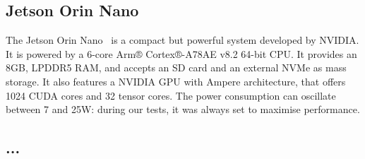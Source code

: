\subsection{Jetson Orin Nano}

The Jetson Orin Nano~\cite{jetson} is a compact but powerful system developed by NVIDIA.
It is powered by a 6-core Arm® Cortex®-A78AE v8.2 64-bit CPU.
It provides an 8GB, LPDDR5 RAM, and accepts an SD card and an external NVMe as mass storage.
It also features a NVIDIA GPU with Ampere architecture, that offers 1024 CUDA cores and 32 tensor cores.
The power consumption can oscillate between 7 and 25W: during our tests, it was always set to maximise performance. 

\subsection{...}
